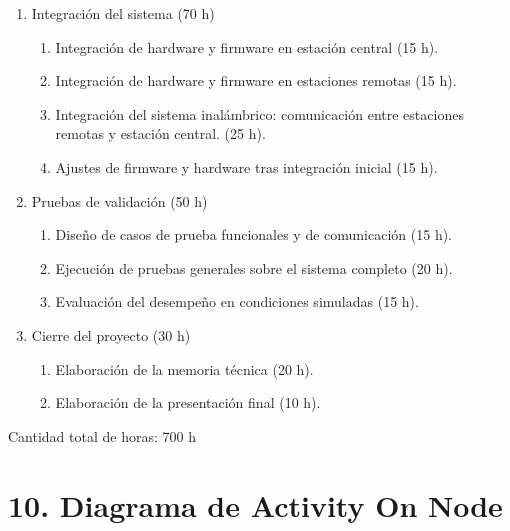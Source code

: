 \documentclass[
11pt, %
]{charter}
\begin{document}
\begin{enumerate}
	\item Integración del sistema (70 h)
	\begin{enumerate}
		\item Integración de hardware y firmware en estación central (15 h).
		\item Integración de hardware y firmware en estaciones remotas (15 h).
		\item Integración del sistema inalámbrico: comunicación entre estaciones remotas y estación central. (25 h).
		\item Ajustes de firmware y hardware tras integración inicial (15 h).
	\end{enumerate}
	
	\item Pruebas de validación (50 h)
	\begin{enumerate}
		\item Diseño de casos de prueba funcionales y de comunicación (15 h).
		\item Ejecución de pruebas generales sobre el sistema completo (20 h).
		\item Evaluación del desempeño en condiciones simuladas (15 h).
	\end{enumerate}
	
	\item Cierre del proyecto (30 h)
	\begin{enumerate}
		\item Elaboración de la memoria técnica (20 h).
		\item Elaboración de la presentación final (10 h).
	\end{enumerate}
\end{enumerate}

Cantidad total de horas: 700 h

\section{10. Diagrama de Activity On Node}
\label{sec:AoN}
\end{document}
